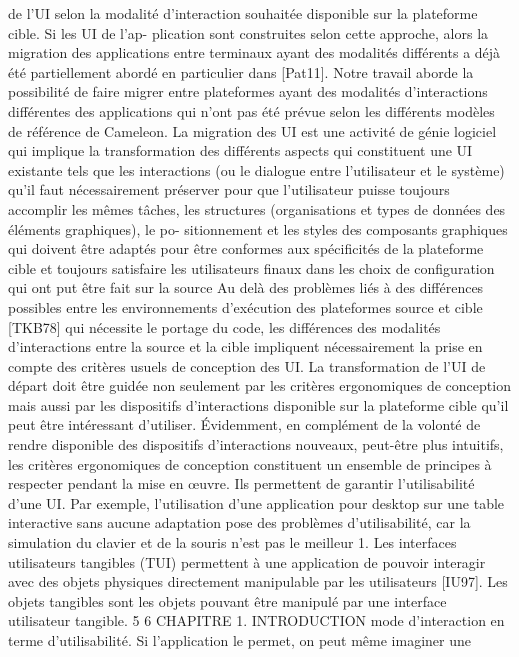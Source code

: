\documentclass{article}
\begin{document}
de l’UI selon la modalité d’interaction souhaitée disponible sur la plateforme cible. Si les UI de l’ap-
plication sont construites selon cette approche, alors la migration des applications entre terminaux
ayant des modalités différents a déjà été partiellement abordé en particulier dans [Pat11]. Notre travail
aborde la possibilité de faire migrer entre plateformes ayant des modalités d’interactions différentes
des applications qui n’ont pas été prévue selon les différents modèles de référence de Cameleon.
La migration des UI est une activité de génie logiciel qui implique la transformation des différents
aspects qui constituent une UI existante tels que les interactions (ou le dialogue entre l’utilisateur
et le système) qu’il faut nécessairement préserver pour que l’utilisateur puisse toujours accomplir
les mêmes tâches, les structures (organisations et types de données des éléments graphiques), le po-
sitionnement et les styles des composants graphiques qui doivent être adaptés pour être conformes
aux spéciﬁcités de la plateforme cible et toujours satisfaire les utilisateurs ﬁnaux dans les choix de
conﬁguration qui ont put être fait sur la source
Au delà des problèmes liés à des différences possibles entre les environnements d’exécution des
plateformes source et cible [TKB78] qui nécessite le portage du code, les différences des modalités
d’interactions entre la source et la cible impliquent nécessairement la prise en compte des critères
usuels de conception des UI. La transformation de l’UI de départ doit être guidée non seulement par
les critères ergonomiques de conception mais aussi par les dispositifs d’interactions disponible sur la
plateforme cible qu’il peut être intéressant d’utiliser.
Évidemment, en complément de la volonté de rendre disponible des dispositifs d’interactions
nouveaux, peut-être plus intuitifs, les critères ergonomiques de conception constituent un ensemble de
principes à respecter pendant la mise en œuvre. Ils permettent de garantir l’utilisabilité d’une UI. Par
exemple, l’utilisation d’une application pour desktop sur une table interactive sans aucune adaptation
pose des problèmes d’utilisabilité, car la simulation du clavier et de la souris n’est pas le meilleur
1. Les interfaces utilisateurs tangibles (TUI) permettent à une application de pouvoir interagir avec des objets physiques
directement manipulable par les utilisateurs [IU97]. Les objets tangibles sont les objets pouvant être manipulé par une
interface utilisateur tangible.
5
6
CHAPITRE 1. INTRODUCTION
mode d’interaction en terme d’utilisabilité. Si l’application le permet, on peut même imaginer une
\end{document}
